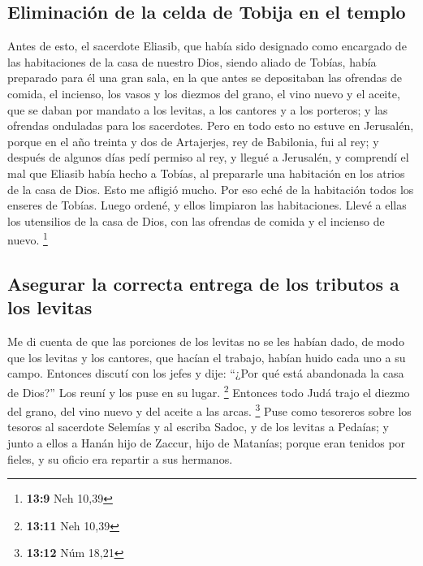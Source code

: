 \hypertarget{eliminaciuxf3n-de-la-celda-de-tobija-en-el-templo}{%
\subsection{Eliminación de la celda de Tobija en el
templo}\label{eliminaciuxf3n-de-la-celda-de-tobija-en-el-templo}}

 Antes de esto, el sacerdote Eliasib, que había sido
designado como encargado de las habitaciones de la casa de nuestro Dios,
siendo aliado de Tobías,  había preparado para él una gran
sala, en la que antes se depositaban las ofrendas de comida, el
incienso, los vasos y los diezmos del grano, el vino nuevo y el aceite,
que se daban por mandato a los levitas, a los cantores y a los porteros;
y las ofrendas onduladas para los sacerdotes.  Pero en
todo esto no estuve en Jerusalén, porque en el año treinta y dos de
Artajerjes, rey de Babilonia, fui al rey; y después de algunos días pedí
permiso al rey,  y llegué a Jerusalén, y comprendí el mal
que Eliasib había hecho a Tobías, al prepararle una habitación en los
atrios de la casa de Dios.  Esto me afligió mucho. Por eso
eché de la habitación todos los enseres de Tobías.  Luego
ordené, y ellos limpiaron las habitaciones. Llevé a ellas los utensilios
de la casa de Dios, con las ofrendas de comida y el incienso de nuevo.
\footnote{\textbf{13:9} Neh 10,39}

\hypertarget{asegurar-la-correcta-entrega-de-los-tributos-a-los-levitas}{%
\subsection{Asegurar la correcta entrega de los tributos a los
levitas}\label{asegurar-la-correcta-entrega-de-los-tributos-a-los-levitas}}

 Me di cuenta de que las porciones de los levitas no se
les habían dado, de modo que los levitas y los cantores, que hacían el
trabajo, habían huido cada uno a su campo.  Entonces
discutí con los jefes y dije: ``¿Por qué está abandonada la casa de
Dios?'' Los reuní y los puse en su lugar. \footnote{\textbf{13:11} Neh
  10,39}  Entonces todo Judá trajo el diezmo del grano,
del vino nuevo y del aceite a las arcas. \footnote{\textbf{13:12} Núm
  18,21}  Puse como tesoreros sobre los tesoros al
sacerdote Selemías y al escriba Sadoc, y de los levitas a Pedaías; y
junto a ellos a Hanán hijo de Zaccur, hijo de Matanías; porque eran
tenidos por fieles, y su oficio era repartir a sus hermanos.

